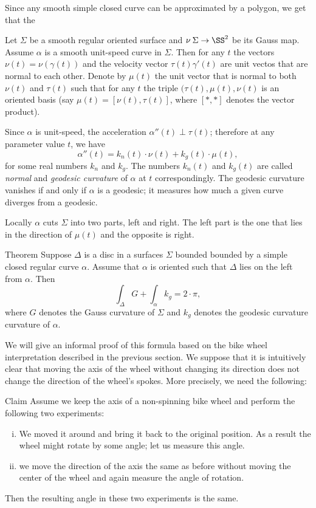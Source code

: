 Since any smooth simple closed curve can be approximated by a polygon, we get that the 





Let $\Sigma$ be a smooth regular oriented surface and $\nu\:\Sigma\to \SS^2$ be its Gauss map.
Assume $\alpha$ is a smooth unit-speed curve in $\Sigma$. 
Then for any $t$ the vectors $\nu(t)=\nu(\gamma(t))$ and the velocity vector $\tau(t)\gamma'(t)$ are unit vectos that are normal to each other.
Denote by $\mu(t)$ the unit vector that is normal to both $\nu(t)$ and $\tau(t)$ such that for any $t$ the triple $(\tau(t),\mu(t),\nu(t)$ is an oriented basis (say $\mu(t)=[\nu(t),\tau(t)]$, where $[{*},{*}]$ denotes the vector product).

Since $\alpha$ is unit-speed, the acceleration $\alpha''(t)\perp\tau(t)$;
therefore at any parameter value $t$, we have
\[\alpha''(t)=k_n(t)\cdot \nu(t)+k_g(t)\cdot \mu(t),\]
for some real numbers $k_n$ and $k_g$.
The numbers $k_n(t)$ and $k_g(t)$ are called \emph{normal} and \emph{geodesic curvature} of $\alpha$ at $t$ correspondingly.
The geodesic curvature vanishes if and only if $\alpha$ is a geodesic; 
it measures how much a given curve diverges from a geodesic.

Locally $\alpha$ cuts $\Sigma$ into two parts, left and right.
The left part is the one that lies in the direction of $\mu(t)$ and the opposite is right.


\begin{thm}{Theorem}
Suppose $\Delta$ is a disc in a surfaces $\Sigma$ 
bounded bounded by a simple closed regular curve $\alpha$.
Assume that $\alpha$ is oriented such that $\Delta$ lies on the left from $\alpha$.
Then
\[\int_\Delta G+\int_\alpha k_g=2\cdot \pi,\]
where $G$ denotes the Gauss curvature of $\Sigma$ and
$k_g$ denotes the geodesic curvature curvature of $\alpha$.

\end{thm}

We will give an informal proof of this formula based on the bike wheel interpretation described in the previous section.
We suppose that it is intuitively clear that moving the axis of the wheel without changing its direction does not change the direction of the wheel's spokes.
More precisely, we need the following:

\begin{thm}{Claim}
Assume we keep the axis of a non-spinning bike wheel and perform the following two experiments:

\begin{enumerate}[(i)]
\item We moved it around and bring it back to the original position. 
As a result the wheel might rotate by some angle; let us measure this angle.

\item we move the direction of the axis the same as before without moving the center of the wheel and again measure the angle of rotation.
\end{enumerate}

Then the resulting angle in these two experiments is the same. 
\end{thm}

